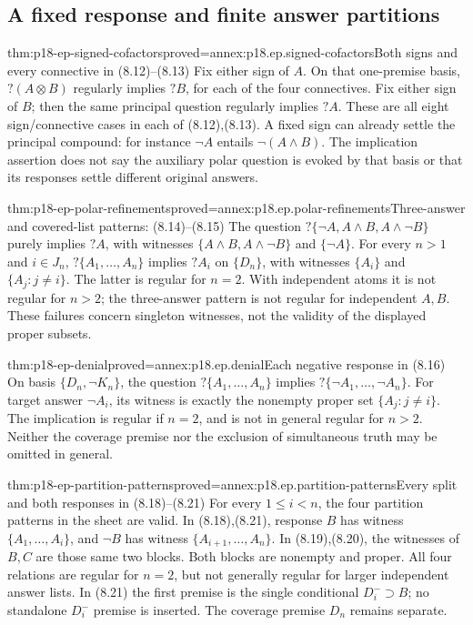 \subsection{A fixed response and finite answer partitions}

\begin{hbtheorem}{thm:p18-ep-signed-cofactors}{proved=annex:p18.ep.signed-cofactors}{Both signs and every connective in (8.12)--(8.13)}
Fix either sign of \(A\). On that one-premise basis,
\(?(A\otimes B)\) regularly implies \(?B\), for each of the four
connectives. Fix either sign of \(B\); then the same principal question
regularly implies \(?A\). These are all eight sign/connective cases
in each of (8.12),(8.13). A fixed sign can already settle the principal
compound: for instance \(\neg A\) entails \(\neg(A\land B)\).
The implication assertion does not say the auxiliary polar question is
evoked by that basis or that its responses settle different original answers.
\end{hbtheorem}

\begin{hbtheorem}{thm:p18-ep-polar-refinements}{proved=annex:p18.ep.polar-refinements}{Three-answer and covered-list patterns: (8.14)--(8.15)}
The question \(?\{\neg A,A\land B,A\land\neg B\}\) purely implies
\(?A\), with witnesses \(\{A\land B,A\land\neg B\}\) and
\(\{\neg A\}\). For every \(n>1\) and \(i\in J_n\),
\(?\{A_1,\ldots,A_n\}\) implies \(?A_i\) on \(\{D_n\}\),
with witnesses \(\{A_i\}\) and \(\{A_j:j\ne i\}\).
The latter is regular for \(n=2\). With independent atoms it is not
regular for \(n>2\); the three-answer pattern is not regular for
independent \(A,B\). These failures concern singleton witnesses, not
the validity of the displayed proper subsets.
\end{hbtheorem}

\begin{hbtheorem}{thm:p18-ep-denial}{proved=annex:p18.ep.denial}{Each negative response in (8.16)}
On basis \(\{D_n,\neg K_n\}\), the question
\(?\{A_1,\ldots,A_n\}\) implies
\(?\{\neg A_1,\ldots,\neg A_n\}\).
For target answer \(\neg A_i\), its witness is exactly the nonempty
proper set \(\{A_j:j\ne i\}\). The implication is regular if
\(n=2\), and is not in general regular for \(n>2\).
Neither the coverage premise nor the exclusion of simultaneous truth
may be omitted in general.
\end{hbtheorem}

\begin{hbtheorem}{thm:p18-ep-partition-patterns}{proved=annex:p18.ep.partition-patterns}{Every split and both responses in (8.18)--(8.21)}
For every \(1\leq i<n\), the four partition patterns in the sheet are
valid. In (8.18),(8.21), response \(B\) has witness
\(\{A_1,\ldots,A_i\}\), and \(\neg B\) has witness
\(\{A_{i+1},\ldots,A_n\}\). In (8.19),(8.20), the witnesses of
\(B,C\) are those same two blocks. Both blocks are nonempty and
proper. All four relations are regular for \(n=2\), but not generally
regular for larger independent answer lists.
In (8.21) the first premise is the single conditional
\(D^-_i\supset B\); no standalone \(D^-_i\) premise is inserted.
The coverage premise \(D_n\) remains separate.
\end{hbtheorem}

